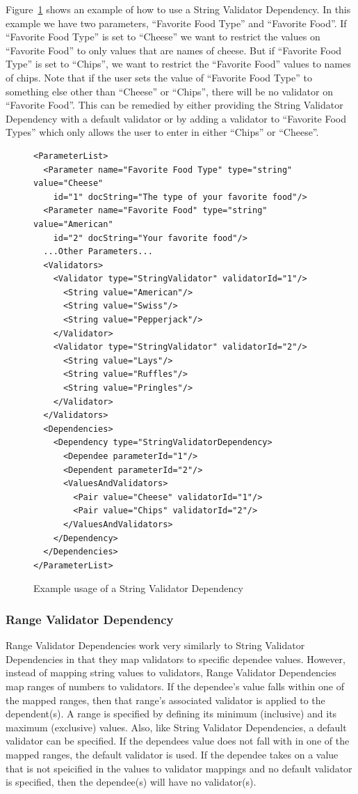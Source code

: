 Figure~\ref{StringValiDepXML} shows an example of how to use a String Validator Dependency. In this example we have two parameters, 
``Favorite Food Type''
and ``Favorite Food''. If ``Favorite Food Type'' is set to ``Cheese'' we want to restrict the values on ``Favorite Food'' to only values that are names
of cheese. But if ``Favorite Food Type'' is set to ``Chips'', we want to restrict the ``Favorite Food'' values to names of chips. Note that if the user
sets the value of ``Favorite Food Type'' to something else other than ``Cheese'' or ``Chips'', there will be no validator on ``Favorite Food''. This can
be remedied by either providing the String Validator Dependency with a default validator or by adding a validator to ``Favorite Food Types'' which only
allows the user to enter in either ``Chips'' or ``Cheese''.
\begin{figure}
\centering
{\footnotesize
\begin{Verbatim}
<ParameterList>
  <Parameter name="Favorite Food Type" type="string" value="Cheese"
    id="1" docString="The type of your favorite food"/>
  <Parameter name="Favorite Food" type="string" value="American"
    id="2" docString="Your favorite food"/>
  ...Other Parameters...
  <Validators>
    <Validator type="StringValidator" validatorId="1"/>
      <String value="American"/>
      <String value="Swiss"/>
      <String value="Pepperjack"/>
    </Validator>
    <Validator type="StringValidator" validatorId="2"/>
      <String value="Lays"/>
      <String value="Ruffles"/>
      <String value="Pringles"/>
    </Validator>
  </Validators>
  <Dependencies>
    <Dependency type="StringValidatorDependency>
      <Dependee parameterId="1"/>
      <Dependent parameterId="2"/>
      <ValuesAndValidators>
        <Pair value="Cheese" validatorId="1"/>
        <Pair value="Chips" validatorId="2"/>
      </ValuesAndValidators>
    </Dependency>
  </Dependencies>
</ParameterList>
\end{Verbatim}
}
\caption{Example usage of a String Validator Dependency}
\label{StringValiDepXML}
\end{figure}

\subsubsection{Range Validator Dependency}
Range Validator Dependencies work very similarly to String Validator Dependencies in that they map validators to specific dependee values. However,
instead of mapping string values to validators, Range Validator Dependencies map ranges of numbers to validators. If the dependee's value falls within one of the 
mapped ranges, then that range's associated validator is applied to the dependent(s). A range is specified by defining its minimum (inclusive) and its maximum (exclusive) 
values. Also, like String Validator Dependencies, a default validator can be specified. If the dependees value does not fall with in one of the mapped ranges, the default 
validator is used. If the dependee takes on a value that is not speicified in the values to validator mappings and no default validator is specified, then the 
dependee(s) will have no validator(s).

